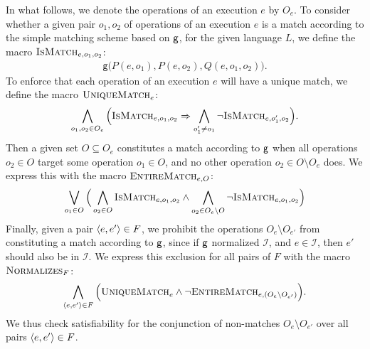 In what follows, we denote the operations of an execution $e$ by $O_e$.
To consider whether a given pair $o_1, o_2$ of operations of an execution $e$
is a match according to the simple matching scheme based on ${\sf g}$, for
the given language $L$, we define the macro $\textsc{IsMatch}_{e,o_1,o_2}$:
\begin{align*}
  \mathsf{g}\big( P(e,o_1), P(e,o_2), Q(e,o_1,o_2) \big).
\end{align*}
To enforce that each operation of an execution $e$ will have a unique match,
we define the macro $\textsc{UniqueMatch}_e$:
\begin{align*}
  \bigwedge_{o_1,o_2 \in O_e} \Big(
    \textsc{IsMatch}_{e,o_1,o_2} \implies
    \bigwedge_{o_1' \neq o_1} \lnot \textsc{IsMatch}_{e,o_1',o_2}
  \Big).
\end{align*}
Then a given set $O \subseteq O_e$ constitutes a match according to
${\sf g}$ when all operations $o_2 \in O$ target some operation $o_1 \in O$,
and no other operation $o_2 \in O \setminus O_e$ does. We express this with the
macro $\textsc{EntireMatch}_{e,O}$:
\begin{align*}
  \bigvee_{o_1 \in O}
  \Big(
  \bigwedge_{o_2 \in O} \textsc{IsMatch}_{e,o_1,o_2}
  \land \bigwedge_{o_2 \in O_e \setminus O} \lnot \textsc{IsMatch}_{e,o_1,o_2}
  \Big)
\end{align*}
Finally, given a pair $\tup{e,e'} \in F$, we prohibit the operations $O_e
\setminus O_{e'}$ from constituting a match according to ${\sf g}$, since if
${\sf g}$ normalized $\mathcal{I}$, and $e \in \mathcal{I}$, then $e'$ should
also be in $\mathcal{I}$. We express this exclusion for all pairs of $F$
with the macro $\textsc{Normalizes}_{F}$:
\begin{align*}
  \bigwedge_{\tup{e,e'}\in F} \Big(
    \textsc{UniqueMatch}_{e}
    \land \lnot \textsc{EntireMatch}_{e,(O_e \setminus O_{e'})}
  \Big).
\end{align*}
We thus check satisfiability for the conjunction of non-matches $O_e \setminus
O_{e'}$ over all pairs $\tup{e,e'} \in F$.

